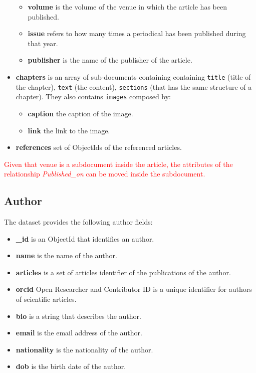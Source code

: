 \documentclass{Configuration_Files/PoliMi3i_thesis}
\begin{document}
\begin{itemize}
\begin{itemize}
					\item \textbf{volume} is the volume of the venue in which the article has been published.
					\item \textbf{issue} refers to how many times a periodical has been published during that year.
					\item \textbf{publisher} is the name of the publisher of the article.
				\end{itemize}
\item \textbf{chapters} is an array of sub-documents containing containing \verb |title| (title of the chapter), \verb |text| (the content),
	 \verb |sections| (that has the same structure of a chapter). They also contains \verb |images| composed by:
				\begin{itemize}
					\item \textbf{caption} the caption of the image.
					\item \textbf{link} the link to the image.
				\end{itemize}
\item \textbf{references} set of ObjectIds of the referenced articles.
\end{itemize}

\textcolor{red}{Given that venue is a subdocument inside the article, the attributes of the relationship \emph{Published\_on} can be moved inside the subdocument.}
\bigskip

\subsection{Author}
The dataset provides the following author fields:
\begin{itemize}
\item \textbf{\_id} is an ObjectId that identifies an author.
\item \textbf{name} is the name of the author.
\item \textbf{articles} is a set of articles identifier of the publications of the author.
\item \textbf{orcid} Open Researcher and Contributor ID is a unique identifier for authors of scientific articles.
\item \textbf{bio} is a string that describes the author.
\item \textbf{email} is the email address of the author.
\item \textbf{nationality} is the nationality of the author.
\item \textbf{dob} is the birth date of the author.
\end{itemize}
\end{document}
